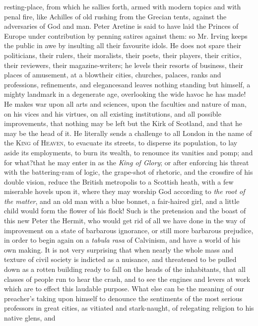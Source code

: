 resting-place, from which he sallies forth, armed with modern
topics and with penal fire, like Achilles of old rushing from the
Grecian tents, against the adversaries of God and man. Peter
Aretine is said to have laid the Princes of Europe under
contribution by penning satires against them: so Mr. Irving keeps
the public in awe by insulting all their favourite idols. He does
not spare their politicians, their rulers, their moralists, their
poets, their players, their critics, their reviewers, their
magazine-writers; he levels their resorts of business, their
places of amusement, at a blow\textemdash their cities, churches,
palaces, ranks and professions, refinements, and
elegances\textemdash and leaves nothing standing but himself, a
mighty landmark in a degenerate age, overlooking the wide havoc he
has made! He makes war upon all arts and sciences, upon the
faculties and nature of man, on his vices and his virtues, on all
existing institutions, and all possible improvements, that nothing
may be left but the Kirk of Scotland, and that he may be the head
of it. He literally sends a challenge to all London in the name of
the \textsc{King} of \textsc{Heaven}, to evacuate its streets, to disperse its
population, to lay aside its employments, to burn its wealth, to
renounce its vanities and pomp; and for what?\textemdash that he
may enter in as the \emph{King of Glory}; or after enforcing his threat
with the battering-ram of logic, the grape-shot of rhetoric, and
the crossfire of his double vision, reduce the British metropolis
to a Scottish heath, with a few miserable hovels upon it, where
they may worship God according to \emph{the root of the matter}, and an
old man with a blue bonnet, a fair-haired girl, and a little child
would form the flower of his flock! Such is the pretension and the
boast of this new Peter the Hermit, who would get rid of all we
have done in the way of improvement on a state of barbarous
ignorance, or still more barbarous prejudice, in order to begin
again on a \emph{tabula rasa} of Calvinism, and have a world of his own
making. It is not very surprising that when nearly the whole mass
and texture of civil society is indicted as a nuisance, and
threatened to be pulled down as a rotten building ready to fall on
the heads of the inhabitants, that all classes of people run to
hear the crash, and to see the engines and levers at work which
are to effect this laudable purpose. What else can be the meaning
of our preacher's taking upon himself to denounce the sentiments
of the most serious professors in great cities, as vitiated and
stark-naught, of relegating religion to his native glens, and
